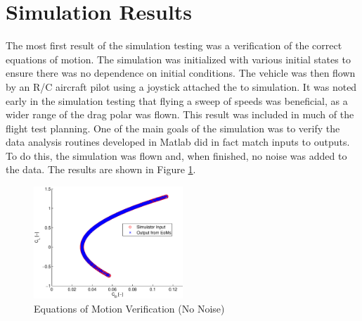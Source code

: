\section{Simulation Results}
The most first result of the simulation testing was a verification of the correct equations of motion. The simulation was initialized with various initial states to ensure there was no dependence on initial conditions. The vehicle was then flown by an R/C aircraft pilot using a joystick attached the to simulation. It was noted early in the simulation testing that flying a sweep of speeds was beneficial, as a wider range of the drag polar was flown. This result was included in much of the flight test planning.
One of the main goals of the simulation was to verify the data analysis routines developed in Matlab did in fact match inputs to outputs. To do this, the simulation was flown and, when finished, no noise was added to the data. The results are shown in Figure \ref{dragPolarNoNoise}.

\begin{figure}[h!]
  \caption{Equations of Motion Verification (No Noise)} \label{dragPolarNoNoise}
  \centering
    \includegraphics[width=0.5\textwidth]{figures/dragPolarNoNoise.eps}
\end{figure}


